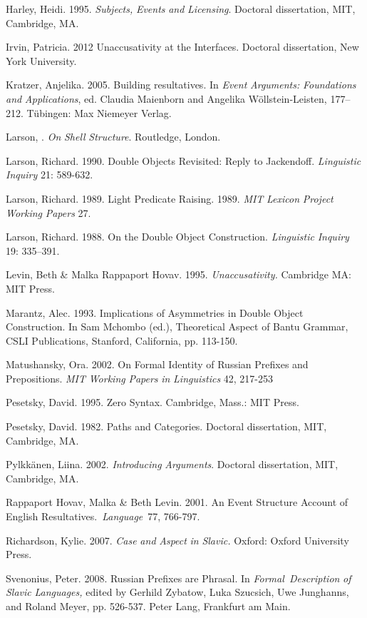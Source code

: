 \documentclass[output=paper,modfonts, nonflat]{langsci/langscibook}
\begin{document}
\begin{styleinnerExample}
Harley, Heidi. 1995. \textit{Subjects,} \textit{Events} \textit{and} \textit{Licensing}. Doctoral dissertation, MIT, Cambridge, MA. 

Irvin, Patricia. 2012 Unaccusativity at the Interfaces. Doctoral dissertation, New York University.

Kratzer, Anjelika. 2005. Building resultatives. In \textit{Event} \textit{Arguments:} \textit{Foundations} \textit{and} \textit{Applications}, ed. Claudia Maienborn and Angelika Wöllstein-Leisten, 177– 212. Tübingen: Max Niemeyer Verlag.

Larson, \citealt{Richard2014}. \textit{On} \textit{Shell} \textit{Structure}. Routledge, London.

Larson, Richard. 1990. Double Objects Revisited: Reply to Jackendoff. \textit{Linguistic} \textit{Inquiry} 21: 589-632.

Larson, Richard. 1989. Light Predicate Raising. 1989. \textit{MIT} \textit{Lexicon} \textit{Project} \textit{Working} \textit{Papers} 27. 

Larson, Richard. 1988. On the Double Object Construction. \textit{Linguistic} \textit{Inquiry} 19: 335–391. 

Levin, Beth \& Malka Rappaport Hovav. 1995. \textit{Unaccusativity.} Cambridge MA: MIT Press.

Marantz, Alec. 1993. Implications of Asymmetries in Double Object Construction. In Sam Mchombo (ed.), Theoretical Aspect of Bantu Grammar, CSLI Publications, Stanford, California, pp. 113-150. 

Matushansky, Ora. 2002. On Formal Identity of Russian Prefixes and Prepositions. \textit{MIT} \textit{Working} \textit{Papers} \textit{in} \textit{Linguistics} 42, 217-253

Pesetsky, David. 1995. Zero Syntax. Cambridge, Mass.: MIT Press.

Pesetsky, David. 1982. Paths and Categories. Doctoral dissertation, MIT, Cambridge, MA.

Pylkkänen, Liina. 2002. \textit{Introducing} \textit{Arguments}. Doctoral dissertation, MIT, Cambridge, MA. 

Rappaport Hovav, Malka \& Beth Levin. 2001. An Event Structure Account of English Resultatives.~\textit{Language}~77, 766-797.

Richardson, Kylie. 2007. \textit{Case} \textit{and} \textit{Aspect} \textit{in} \textit{Slavic.} Oxford: Oxford University Press. 

Svenonius, Peter. 2008. Russian Prefixes are Phrasal. In \textit{Formal~Description} \textit{of} \textit{Slavic} \textit{Languages,} edited by Gerhild Zybatow, Luka Szucsich, Uwe Junghanns, and Roland Meyer, pp. 526-537. Peter Lang, Frankfurt am Main. 


\end{styleinnerExample}
\end{document}
